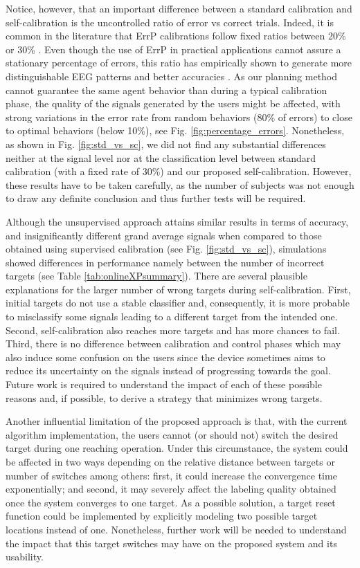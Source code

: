 \documentclass[10pt,letterpaper]{article}
\begin{document}
Notice, however, that an important difference between a standard calibration and self-calibration is the uncontrolled ratio of error vs correct trials. Indeed, it is common in the literature that ErrP calibrations follow fixed ratios between 20\% or 30\% \cite{chavarriaga2010learning, iturrate13}. Even though the use of ErrP in practical applications cannot assure a stationary percentage of errors, this ratio has empirically shown to generate more distinguishable EEG patterns and  better accuracies \cite{chavarriaga2010learning}. As our planning method cannot guarantee the same agent behavior than during a typical calibration phase, the quality of the signals generated by the users might be affected, with strong variations in the error rate from random behaviors (80\% of errors) to close to optimal behaviors (below 10\%), see Fig. \ref{fig:percentage_errors}. Nonetheless, as shown in Fig. \ref{fig:std_vs_sc}, we did not find any substantial differences neither at the signal level nor at the classification level between standard calibration (with a fixed rate of 30\%) and our proposed self-calibration. However, these results have to be taken carefully, as the number of subjects was not enough to draw any definite conclusion and thus further tests will be required.

Although the unsupervised approach attains similar results in terms of accuracy, and insignificantly different grand average signals when compared to those obtained using supervised calibration (see Fig. \ref{fig:std_vs_sc}), simulations showed differences in performance namely between the number of incorrect targets (see Table \ref{tab:onlineXPsummary}). There are several plausible explanations for the larger number of wrong targets during self-calibration. First, initial targets do not use a stable classifier and, consequently, it is more probable to misclassify some signals leading to a different target from the intended one. Second, self-calibration also reaches more targets and has more chances to fail. Third, there is no difference between calibration and control phases which may also induce some confusion on the users since the device sometimes aims to reduce its uncertainty on the signals instead of progressing towards the goal. Future work is required to understand the impact of each of these possible reasons and, if possible, to derive a strategy that minimizes wrong targets.

Another influential limitation of the proposed approach is that, with the current algorithm implementation, the users cannot (or should not) switch the desired target during one reaching operation. Under this circumstance, the system could be affected in two ways depending on the relative distance between targets or number of switches among others: first, it could increase the convergence time exponentially; and second, it may severely affect the labeling quality obtained once the system converges to one target. As a possible solution, a target reset function could be implemented by explicitly modeling two possible target locations instead of one. Nonetheless, further work will be needed to understand the impact that this target switches may have on the proposed system and its usability.
\end{document}
